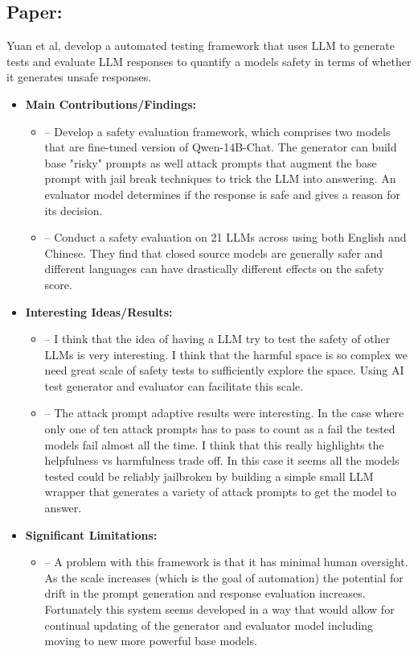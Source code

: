 \documentclass{article}[11pt]
\newcommand{\paperdetails}[5]{
\subsection*{Paper: \fullcite{#1}}
#2
\begin{itemize}
    \item \textbf{Main Contributions/Findings:}
    \begin{itemize}
        #3
    \end{itemize}
    \item \textbf{Interesting Ideas/Results:}
    \begin{itemize}
        #4
    \end{itemize}
    \item \textbf{Significant Limitations:}
    \begin{itemize}
        #5
    \end{itemize}
\end{itemize}
}
\begin{document}
\begin{mdframed}[]
\paperdetails{yuanSEvalAutomatedComprehensive2025}{
    Yuan et al, develop a automated testing framework that uses LLM to generate tests and evaluate LLM responses to quantify a models safety in terms of whether it generates unsafe responses.
}{
    \item [--] Develop a safety evaluation framework, which comprises two models that are fine-tuned version of Qwen-14B-Chat. The generator can build base "risky" prompts as well attack prompts that augment the base prompt with jail break techniques to trick the LLM into answering. An evaluator model determines if the response is safe and gives a reason for its decision.
    \item [--] Conduct a safety evaluation on 21 LLMs across using both English and Chinese. They find that closed source models are generally safer and different languages can have drastically different effects on the safety score.
}{
    \item [--] I think that the idea of having a LLM try to test the safety of other LLMs is very interesting. I think that the harmful space is so complex we need great scale of safety tests to sufficiently explore the space. Using AI test generator and evaluator can facilitate this scale.
    \item [--] The attack prompt adaptive results were interesting. In the case where only one of ten attack prompts has to pass to count as a fail the tested models fail almost all the time. I think that this really highlights the helpfulness vs harmfulness trade off. In this case it seems all the models tested could be reliably jailbroken by building a simple small LLM wrapper that generates a variety of attack prompts to get the model to answer.
}{
    \item [--] A problem with this framework is that it has minimal human oversight. As the scale increases (which is the goal of automation) the potential for drift in the prompt generation and response evaluation increases. Fortunately this system seems developed in a way that would allow for continual updating of the generator and evaluator model including moving to new more powerful base models.
}

\end{mdframed}
\end{document}
